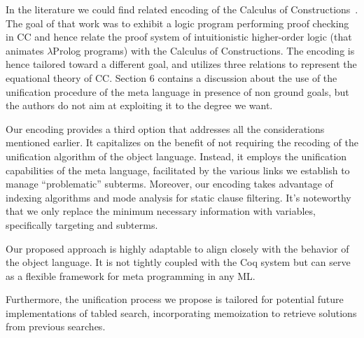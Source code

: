 \documentclass[sigconf,natbib=false,review]{acmart}
\begin{document}
In the literature we could find related encoding of the Calculus of
Constructions~\cite{felty93lics}. The goal of that work was to exhibit
a logic program performing proof checking in CC and hence relate the
proof system of intuitionistic higher-order logic (that animates $\lambda$Prolog
programs) with the Calculus of Constructions. The encoding is hence tailored
toward a different goal, and utilizes three relations to represent the
equational theory of CC. Section 6 contains a discussion about the use of the
unification procedure of the meta language in presence of non ground goals, but
the authors do not aim at exploiting it to the degree we want.


Our encoding provides a third option that addresses all the considerations
mentioned earlier. It capitalizes on the benefit of not requiring the recoding
of the unification algorithm of the object language. Instead, it employs the
unification capabilities of the meta language, facilitated by the various links
we establish to manage ``problematic'' subterms. Moreover, our encoding takes
advantage of indexing algorithms and mode analysis for static clause filtering. It's noteworthy
that we only replace the minimum necessary information with variables,
specifically targeting \maybeeta and \notllambda subterms.

Our proposed approach is highly adaptable to
align closely with the behavior of the object language. It is not tightly
coupled with the Coq system but can serve as a flexible framework for meta
programming in any ML.

Furthermore, the unification process we propose is tailored for potential future
implementations of tabled search, incorporating memoization to retrieve
solutions from previous searches.





\printbibliography

\clearpage


\end{document}
